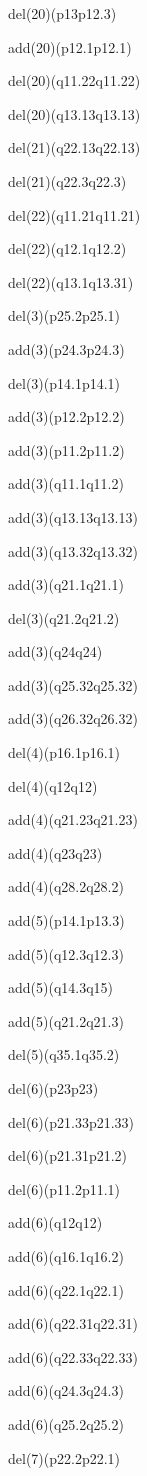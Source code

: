 \documentclass[]{article}
\begin{document}
del(20)(p13p12.3)

add(20)(p12.1p12.1)

del(20)(q11.22q11.22)

del(20)(q13.13q13.13)

del(21)(q22.13q22.13)

del(21)(q22.3q22.3)

del(22)(q11.21q11.21)

del(22)(q12.1q12.2)

del(22)(q13.1q13.31)

del(3)(p25.2p25.1)

add(3)(p24.3p24.3)

del(3)(p14.1p14.1)

add(3)(p12.2p12.2)

add(3)(p11.2p11.2)

add(3)(q11.1q11.2)

add(3)(q13.13q13.13)

add(3)(q13.32q13.32)

add(3)(q21.1q21.1)

del(3)(q21.2q21.2)

add(3)(q24q24)

add(3)(q25.32q25.32)

add(3)(q26.32q26.32)

del(4)(p16.1p16.1)

del(4)(q12q12)

add(4)(q21.23q21.23)

add(4)(q23q23)

add(4)(q28.2q28.2)

add(5)(p14.1p13.3)

add(5)(q12.3q12.3)

add(5)(q14.3q15)

add(5)(q21.2q21.3)

del(5)(q35.1q35.2)

del(6)(p23p23)

del(6)(p21.33p21.33)

del(6)(p21.31p21.2)

del(6)(p11.2p11.1)

add(6)(q12q12)

add(6)(q16.1q16.2)

add(6)(q22.1q22.1)

add(6)(q22.31q22.31)

add(6)(q22.33q22.33)

add(6)(q24.3q24.3)

add(6)(q25.2q25.2)

del(7)(p22.2p22.1)
\end{document}
